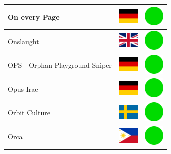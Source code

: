 \documentclass[12pt, a4paper, twoside]{report}
\begin{document}
\begin{center}
\begin{longtable}{|p{5cm}|p{2cm}|p{2cm}|}
 On every Page                                              & \includegraphics[width=1cm]{../img/flags/de} &   \includegraphics[width=1cm]{../likes/y} \\ \hline
 Onslaught                                                  & \includegraphics[width=1cm]{../img/flags/gb} &   \includegraphics[width=1cm]{../likes/y} \\ \hline
 OPS - Orphan Playground Sniper                             & \includegraphics[width=1cm]{../img/flags/de} &   \includegraphics[width=1cm]{../likes/y} \\ \hline
 Opus Irae                                                  & \includegraphics[width=1cm]{../img/flags/de} &   \includegraphics[width=1cm]{../likes/y} \\ \hline
 Orbit Culture                                              & \includegraphics[width=1cm]{../img/flags/se} &   \includegraphics[width=1cm]{../likes/y} \\ \hline
 Orca                                                       & \includegraphics[width=1cm]{../img/flags/ph} &   \includegraphics[width=1cm]{../likes/y} \\ \hline

\end{longtable}
\end{center}
\end{document}
